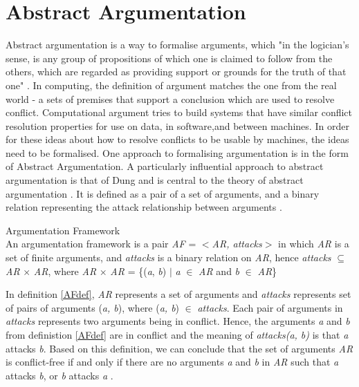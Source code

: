\section{Abstract Argumentation} \label{abstractArgumentation}
Abstract argumentation is a way to formalise arguments, which "in the logician's sense, is any group of propositions of which one is claimed to follow from the others, which are regarded as providing support or grounds for the truth of that one" \citep{argument}. In computing, the definition of argument matches the one from the real world - a sets of premises that support a conclusion which are used to resolve conflict. Computational argument tries to build systems that have similar conflict resolution properties for use on data, in software,and between machines. In order for these ideas about how to resolve conflicts to be usable by machines, the ideas need to be formalised. One approach to formalising argumentation is in the form of Abstract Argumentation. A particularly influential approach to abstract argumentation is that of Dung \citep{dung1995} and is central to the theory of abstract argumentation \citep{baroni2011introduction}. It is defined as a pair of a set of arguments, and a binary relation representing the attack relationship between arguments \citep{dung1995}. 

\theoremstyle{definition}
\begin{definition}{Argumentation Framework}
\label{AFdef}\\
An argumentation framework is a pair \textit{AF} = $<$\textit{AR, attacks}$>$ in which \textit{AR} is a set of finite arguments, and \textit{attacks} is a binary relation on \textit{AR}, hence \textit{attacks} $\subseteq$ \textit{AR} $\times$ \textit{AR}, where \textit{AR} $\times$ \textit{AR} = \{(\textit{a}, \textit{b}) $\vert$ \textit{a} $\in$ \textit{AR} and \textit{b} $\in$ \textit{AR}\}
\end{definition}

In definition \ref{AFdef}, \textit{AR} represents a set of arguments and \textit{attacks} represents set of pairs of arguments (\textit{a, b}), where (\textit{a, b}) $\in$ \textit{attacks}. Each pair of arguments in \textit{attacks} represents two arguments being in conflict. Hence, the arguments \textit{a} and \textit{b} from definistion \ref{AFdef} are in conflict and the meaning of \textit{attacks(a, b)} is that \textit{a} attacks \textit{b}. Based on this definition, we can conclude that the set of arguments \textit{AR} is conflict-free if and only if there are no arguments \textit{a} and \textit{b} in \textit{AR} such that \textit{a} attacks \textit{b}, or \textit{b} attacks \textit{a} \citep{dung1995}.

